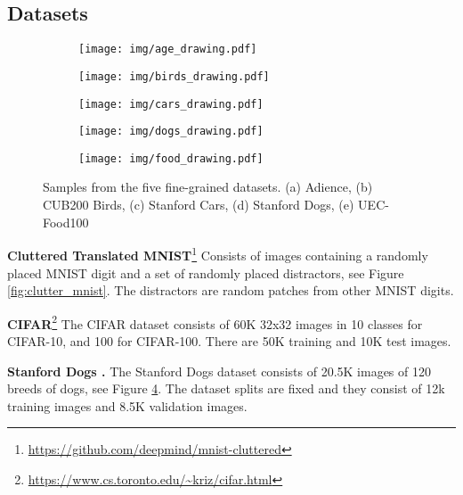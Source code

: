 \documentclass[runningheads]{llncs}
\begin{document}
\subsection{Datasets}
\begin{figure}[t!]
\centering
\begin{subfigure}[t]{0.19\textwidth}
\centering
\texttt{[image: img/age\_drawing.pdf]}
\caption{}
\label{fig:adience_sample}
\end{subfigure}
\begin{subfigure}[t]{0.19\textwidth}
\centering
\texttt{[image: img/birds\_drawing.pdf]}
\caption{}
\label{fig:birds_sample}
\end{subfigure}
\begin{subfigure}[t]{0.19\textwidth}
\centering
\texttt{[image: img/cars\_drawing.pdf]}
\caption{}
\label{fig:cars_sample}
\end{subfigure}
\begin{subfigure}[t]{0.19\textwidth}
\centering
\texttt{[image: img/dogs\_drawing.pdf]}
\caption{}
\label{fig:dogs_sample}
\end{subfigure}
\begin{subfigure}[t]{0.19\textwidth}
\centering
\texttt{[image: img/food\_drawing.pdf]}
\caption{}
\label{fig:food_sample}
\end{subfigure}
\caption{Samples from the five fine-grained datasets. (a) Adience, (b) CUB200 Birds, (c) Stanford Cars, (d) Stanford Dogs, (e) UEC-Food100}
\end{figure}

\noindent\textbf{Cluttered Translated MNIST}\footnote{\url{https://github.com/deepmind/mnist-cluttered}}
Consists of  images containing a randomly placed MNIST \cite{lecun1998mnist} digit and a set of  randomly placed distractors, see Figure \ref{fig:clutter_mnist}. The distractors are random  patches from other MNIST digits.

\medskip
\noindent\textbf{CIFAR}\footnote{\url{https://www.cs.toronto.edu/~kriz/cifar.html}}
The CIFAR dataset consists of 60K 32x32 images in 10 classes for CIFAR-10, and 100 for CIFAR-100. There are 50K training and 10K test images. 

\medskip
\noindent\textbf{Stanford Dogs \cite{khosla2011novel}.}
The Stanford Dogs dataset consists of 20.5K images of 120 breeds of dogs, see Figure \ref{fig:dogs_sample}. The dataset splits are fixed and they consist of 12k training images and 8.5K validation images. 
\end{document}

